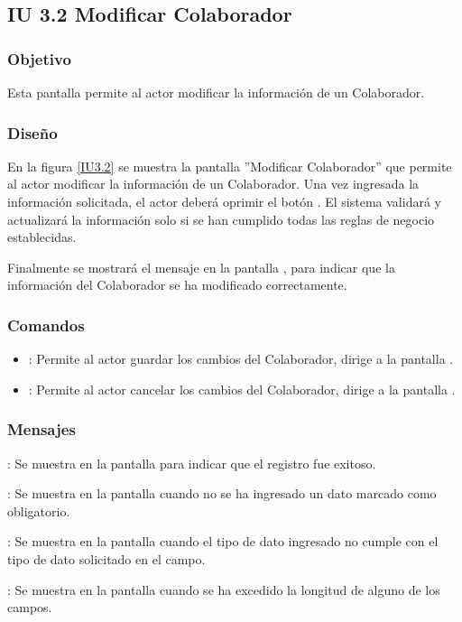 \subsection{IU 3.2 Modificar Colaborador}

\subsubsection{Objetivo}
	Esta pantalla permite al actor modificar la información de un Colaborador.
\subsubsection{Diseño}
	En la figura \ref{IU3.2} se muestra la pantalla ''Modificar Colaborador'' que permite al actor modificar la información de un Colaborador.
	Una vez ingresada la información solicitada, el actor deberá oprimir el botón  . El sistema validará y actualizará la información solo si se han cumplido todas las reglas de negocio establecidas.
	
	Finalmente se mostrará el mensaje  en la pantalla , para indicar que la información del Colaborador se ha modificado correctamente.

\label{IU3.2}
\subsubsection{Comandos}
\begin{itemize}
	\item {}: Permite al actor guardar los cambios del Colaborador, dirige a la pantalla .
	\item {}: Permite al actor cancelar los cambios del Colaborador, dirige a la pantalla .
\end{itemize}

\subsubsection{Mensajes}

\begin{Citemize}
	\item {}: Se muestra en la pantalla  para indicar que el registro fue exitoso.
	\item {}: Se muestra en la pantalla  cuando no se ha ingresado un dato marcado como obligatorio.
	\item {}: Se muestra en la pantalla  cuando el tipo de dato ingresado no cumple con el tipo de dato solicitado en el campo.
	\item {}: Se muestra en la pantalla  cuando se ha excedido la longitud de alguno de los campos.
\end{Citemize}
